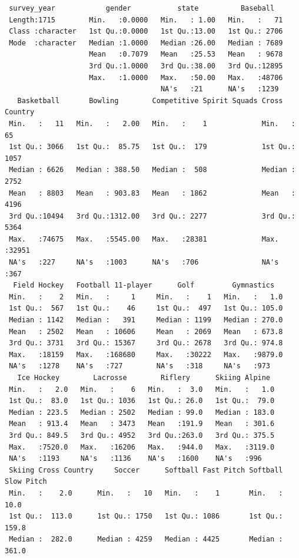 \documentclass[
  letterpaper,
  DIV=11,
  numbers=noendperiod]{scrartcl}
\begin{document}
\begin{verbatim}
 survey_year            gender           state          Baseball    
 Length:1715        Min.   :0.0000   Min.   : 1.00   Min.   :   71  
 Class :character   1st Qu.:0.0000   1st Qu.:13.00   1st Qu.: 2706  
 Mode  :character   Median :1.0000   Median :26.00   Median : 7689  
                    Mean   :0.7079   Mean   :25.53   Mean   : 9678  
                    3rd Qu.:1.0000   3rd Qu.:38.00   3rd Qu.:12895  
                    Max.   :1.0000   Max.   :50.00   Max.   :48706  
                                     NA's   :21      NA's   :1239   
   Basketball       Bowling        Competitive Spirit Squads Cross Country  
 Min.   :   11   Min.   :   2.00   Min.   :    1             Min.   :   65  
 1st Qu.: 3066   1st Qu.:  85.75   1st Qu.:  179             1st Qu.: 1057  
 Median : 6626   Median : 388.50   Median :  508             Median : 2752  
 Mean   : 8803   Mean   : 903.83   Mean   : 1862             Mean   : 4196  
 3rd Qu.:10494   3rd Qu.:1312.00   3rd Qu.: 2277             3rd Qu.: 5364  
 Max.   :74675   Max.   :5545.00   Max.   :28381             Max.   :32951  
 NA's   :227     NA's   :1003      NA's   :706               NA's   :367    
  Field Hockey   Football 11-player      Golf         Gymnastics    
 Min.   :    2   Min.   :     1     Min.   :    1   Min.   :   1.0  
 1st Qu.:  567   1st Qu.:    46     1st Qu.:  497   1st Qu.: 105.0  
 Median : 1142   Median :   391     Median : 1199   Median : 270.0  
 Mean   : 2502   Mean   : 10606     Mean   : 2069   Mean   : 673.8  
 3rd Qu.: 3731   3rd Qu.: 15367     3rd Qu.: 2678   3rd Qu.: 974.8  
 Max.   :18159   Max.   :168680     Max.   :30222   Max.   :9879.0  
 NA's   :1278    NA's   :727        NA's   :318     NA's   :973     
   Ice Hockey        Lacrosse        Riflery      Skiing Alpine   
 Min.   :   2.0   Min.   :    6   Min.   :  3.0   Min.   :   1.0  
 1st Qu.:  83.0   1st Qu.: 1036   1st Qu.: 26.0   1st Qu.:  79.0  
 Median : 223.5   Median : 2502   Median : 99.0   Median : 183.0  
 Mean   : 913.4   Mean   : 3473   Mean   :191.9   Mean   : 301.6  
 3rd Qu.: 849.5   3rd Qu.: 4952   3rd Qu.:263.0   3rd Qu.: 375.5  
 Max.   :7520.0   Max.   :16206   Max.   :944.0   Max.   :3119.0  
 NA's   :1193     NA's   :1136    NA's   :1600    NA's   :996     
 Skiing Cross Country     Soccer      Softball Fast Pitch Softball Slow Pitch
 Min.   :    2.0      Min.   :   10   Min.   :    1       Min.   :   10.0    
 1st Qu.:  113.0      1st Qu.: 1750   1st Qu.: 1086       1st Qu.:  159.8    
 Median :  282.0      Median : 4259   Median : 4425       Median :  361.0    

\end{verbatim}
\end{document}
